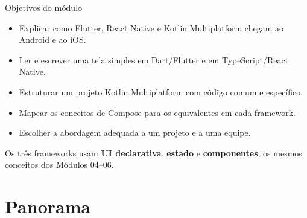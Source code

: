 \documentclass[aspectratio=169,10pt]{beamer}
\begin{document}
\capa

\begin{frame}{Objetivos do módulo}
  \begin{conceito}
    \begin{itemize}
      \item Explicar como Flutter, React Native e Kotlin Multiplatform chegam ao Android e ao iOS.
      \item Ler e escrever uma tela simples em Dart/Flutter e em TypeScript/React Native.
      \item Estruturar um projeto Kotlin Multiplatform com código comum e específico.
      \item Mapear os conceitos de Compose para os equivalentes em cada framework.
      \item Escolher a abordagem adequada a um projeto e a uma equipe.
    \end{itemize}
  \end{conceito}
  \begin{dica}
    Os três frameworks usam \textbf{UI declarativa}, \textbf{estado} e \textbf{componentes}, os mesmos conceitos dos Módulos 04--06.
  \end{dica}
\end{frame}

\sumario

\section{Panorama}
\end{document}

